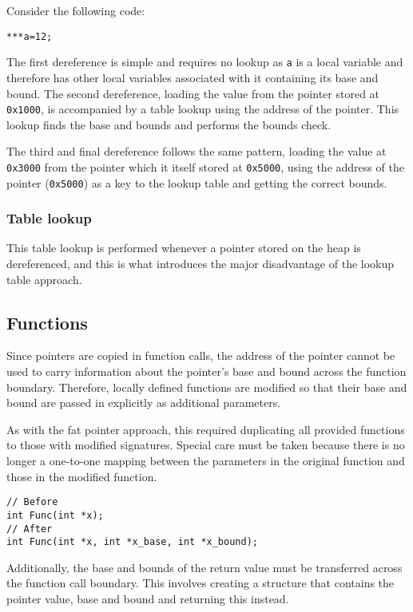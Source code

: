 Consider the following code:

\begin{verbatim}
***a=12;
\end{verbatim}

The first dereference is simple and requires no lookup as \verb!a! is a local variable and therefore has other local variables associated with it containing its base and bound.
The second dereference, loading the value from the pointer stored at \verb!0x1000!, is accompanied by a table lookup using the address of the pointer.
This lookup finds the base and bounds and performs the bounds check.

The third and final dereference follows the same pattern, loading the value at \verb!0x3000! from the pointer which it itself stored at \verb!0x5000!, using the address of the pointer (\verb!0x5000!) as a key to the lookup table and getting the correct bounds.

\subsubsection{Table lookup}

This table lookup is performed whenever a pointer stored on the heap is dereferenced, and this is what introduces the major disadvantage of the lookup table approach.


\subsection{Functions}

Since pointers are copied in function calls, the address of the pointer cannot be used to carry information about the pointer's base and bound across the function boundary.
Therefore, locally defined functions are modified so that their base and bound are passed in explicitly as additional parameters.

As with the fat pointer approach, this required duplicating all provided functions to those with modified signatures.
Special care must be taken because there is no longer a one-to-one mapping between the parameters in the original function and those in the modified function.

\begin{verbatim}
// Before
int Func(int *x);
// After
int Func(int *x, int *x_base, int *x_bound);
\end{verbatim}

Additionally, the base and bounds of the return value must be transferred across the function call boundary.
This involves creating a structure that contains the pointer value, base and bound and returning this instead.

